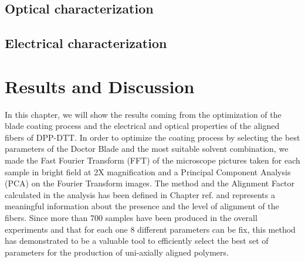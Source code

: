 \documentclass  [
  paper    = a4,
  BCOR     = 10mm,
  twoside,
  fontsize = 12pt,
  fleqn,
  toc      = bibnumbered,
  toc      = listofnumbered,
  numbers  = noendperiod,
  headings = normal,
  listof   = leveldown,
  version  = 3.03
]                                       {scrreprt}
\begin{document}
	\section{Optical characterization}
	
	\section{Electrical characterization}
	
	
	
  \newpage
  \chapter{Results and Discussion}\label{cha:results}
  
  In this chapter, we will show the results coming from the optimization of the blade coating process and the electrical and optical properties of the aligned fibers of DPP-DTT. In order to optimize the coating process by selecting the best parameters of the Doctor Blade and the most suitable solvent combination, we made the Fast Fourier Transform (FFT) of the microscope pictures taken for each sample in bright field at 2X magnification and a Principal Component Analysis (PCA) on the Fourier Transform images. The method and the Alignment Factor calculated in the analysis has been defined in Chapter ref. and represents a meaningful information about the presence and the level of alignment of the fibers. Since more than 700 samples have been produced in the overall experiments and that for each one 8 different parameters can be fix, this method has demonstrated to be a valuable tool to efficiently select the best set of parameters for the production of uni-axially aligned polymers.\\
  
\end{document}
